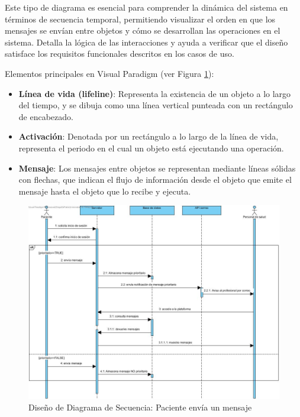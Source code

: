 \documentclass{article}
\begin{document}
Este tipo de diagrama es esencial para comprender la dinámica del sistema en términos de secuencia temporal, permitiendo visualizar el orden en que los mensajes se envían entre objetos y cómo se desarrollan las operaciones en el sistema. Detalla la lógica de las interacciones y ayuda a verificar que el diseño satisface los requisitos funcionales descritos en los casos de uso.

Elementos principales en Visual Paradigm (ver Figura \ref{fig:secuencia_diagrama}):
\begin{itemize}
	\item \textbf{Línea de vida (lifeline)}: Representa la existencia de un objeto a lo largo del tiempo, y se dibuja como una línea vertical punteada con un rectángulo de encabezado.
	\item \textbf{Activación}: Denotada por un rectángulo a lo largo de la línea de vida, representa el periodo en el cual un objeto está ejecutando una operación.
	\item \textbf{Mensaje}: Los mensajes entre objetos se representan mediante líneas sólidas con flechas, que indican el flujo de información desde el objeto que emite el mensaje hasta el objeto que lo recibe y ejecuta.
\end{itemize}

\begin{figure}[h!]
	\begin{center} 
		\includegraphics[width=1\textwidth]{images/Diagrama_de_secuencia_rehabilitacion.jpg}
		\caption{Diseño de Diagrama de Secuencia: Paciente envía un mensaje}
		\label{fig:secuencia_diagrama}
	\end{center}
\end{figure}
\end{document}
